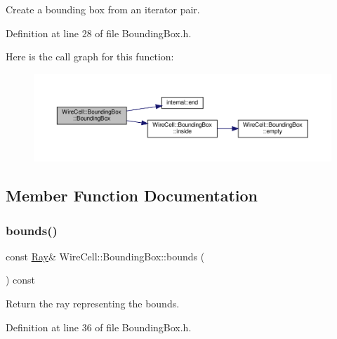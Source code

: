 Create a bounding box from an iterator pair. 



Definition at line 28 of file Bounding\+Box.\+h.

Here is the call graph for this function\+:
\nopagebreak
\begin{figure}[H]
\begin{center}
\leavevmode
\includegraphics[width=350pt]{class_wire_cell_1_1_bounding_box_ac84d096b79ddd8ea2b4d73c1d324c739_cgraph}
\end{center}
\end{figure}


\subsection{Member Function Documentation}
\mbox{\label{class_wire_cell_1_1_bounding_box_a3a0816d852fb478e057496a0409e0c72}} 
\subsubsection{\texorpdfstring{bounds()}{bounds()}}
{\footnotesize\ttfamily const \hyperlink{namespace_wire_cell_a3ab20d9b438feb7eb1ffaab9ba98af0c}{Ray}\& Wire\+Cell\+::\+Bounding\+Box\+::bounds (\begin{DoxyParamCaption}{ }\end{DoxyParamCaption}) const\hspace{0.3cm}{\ttfamily [inline]}}



Return the ray representing the bounds. 



Definition at line 36 of file Bounding\+Box.\+h.

